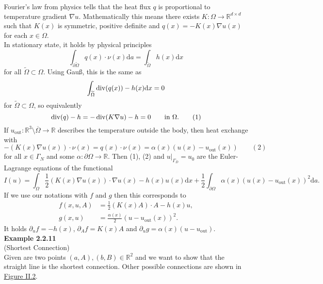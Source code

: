 Fourier's law from physics tells that the heat flux $q$ is proportional to temperature gradient $\nabla u$. Mathematically this means there exists $K:\Omega\longrightarrow\mathbb{R}^{d\times d}$ such that $K(x)$ is symmetric, positive definite and $q(x)=-K(x)\nabla u(x)$ for each $x\in\Omega$.\\

In stationary state, it holds by physical principles
\[\int_{\partial\widetilde{\Omega}}{q(x)\cdot\nu(x)\mathrm{d}a}=\int_{\widetilde{\Omega}}{h(x)\mathrm{d}x}\]
for all $\widetilde{\Omega}\subset\Omega$. Using Gau{\ss}, this is the same as
\[\int_{\widetilde{\Omega}}{\operatorname{div}\mathopen{}\left(q(x)\right)\mathclose{}-h(x)\mathrm{d}x}=0\]
for $\widetilde{\Omega}\subset\Omega$, so equivalently
\[\operatorname{div}\mathopen{}\left(q\right)\mathclose{}-h=-\operatorname{div}\mathopen{}\left(K\nabla u\right)\mathclose{}-h=0\qquad\text{in }\Omega.\qquad(1)\]
If $u_\text{out}:\mathbb{R}^3\setminus\overline{\Omega}\longrightarrow\mathbb{R}$ describes the temperature outside the body, then heat exchange with
\[-(K(x)\nabla u(x))\cdot\nu(x)=q(x)\cdot\nu(x)=\alpha(x)(u(x)-u_\text{out}(x))\qquad(2)\]
for all $x\in\Gamma_N$ and some $\alpha:\partial\Omega\longrightarrow\mathbb{R}$. Then (1), (2) and $u|_{\Gamma_D}=u_0$ are the Euler-Lagrange equations of the functional
\[I(u)=\int_\Omega{\frac{1}{2}(K(x)\nabla u(x))\cdot\nabla u(x)-h(x)u(x)\mathrm{d}x}+\frac{1}{2}\int_{\partial\Omega}{\alpha(x)(u(x)-u_\text{out}(x))^2\mathrm{d}a}.\]
If we use our notations with $f$ and $g$ then this corresponds to
\begin{align*}
	f(x,u,A)&=\frac{1}{2}(K(x)A)\cdot A-h(x)u,\\
	g(x,u)&=\frac{\alpha(x)}{2}(u-u_\text{out}(x))^2.
\end{align*}
It holds $\partial_uf=-h(x)$, $\partial_Af=K(x)A$ and $\partial_ug=\alpha(x)(u-u_\text{out})$.\\[11pt]

\hypertarget{example_2_2_11}{\textbf{Example 2.2.11}}\\
(Shortest Connection)\\
Given are two points $(a,A),(b,B)\in\mathbb{R}^2$ and we want to show that the straight line is the shortest connection. Other possible connections are shown in \hyperref[fig:example_2_2_11]{Figure II.2}.\\


